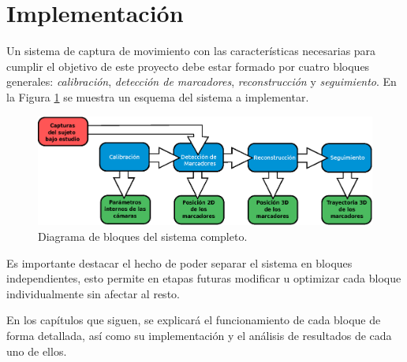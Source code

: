 \section{Implementación}\label{implementacion}

Un sistema de captura de movimiento con las características necesarias para cumplir el objetivo de este proyecto debe estar formado por cuatro bloques generales: \emph{calibración}, \emph{detección de marcadores}, \emph{reconstrucción} y \emph{seguimiento}. En la Figura \ref{bloquesSist} se muestra un esquema del sistema a implementar.

\begin{figure}[ht!]
\centering
\hspace{-0.5cm}
\includegraphics[scale=0.5]{imagenes/Sistema_completo/Diagrama_de_bloques.eps}
\caption{Diagrama de bloques del sistema completo.}
\label{bloquesSist}
\end{figure}

Es importante destacar el hecho de poder separar el sistema en bloques independientes,
esto permite en etapas futuras modificar u optimizar cada bloque individualmente sin afectar al resto.

En los capítulos que siguen, se explicará el funcionamiento de cada bloque de forma detallada, así como su implementación y el análisis de resultados de cada uno de ellos.
